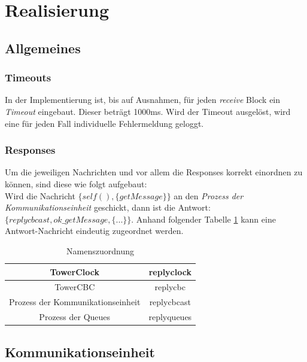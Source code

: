 \section{Realisierung}

\subsection{Allgemeines}

\subsubsection{Timeouts}

In der Implementierung ist, bis auf Ausnahmen, für jeden \textit{receive} Block ein \textit{Timeout} eingebaut. Dieser beträgt 1000ms. Wird der Timeout ausgelöst, wird eine für jeden Fall individuelle Fehlermeldung geloggt.

\subsubsection{Responses}

Um die jeweiligen Nachrichten und vor allem die Responses korrekt einordnen zu können, sind diese wie folgt aufgebaut:\\
Wird die Nachricht $\{self(), \{getMessage\}\}$ an den \textit{Prozess der Kommunikationseinheit} geschickt, dann ist die Antwort: $\{replycbcast, ok\_getMessage, \{...\}\}$. Anhand folgender Tabelle \ref{tab:namenszuordnung} kann eine Antwort-Nachricht eindeutig zugeordnet werden.

\begin{table}[h]
    \centering
    \begin{tabular}{|c|c|}
        \hline
        TowerClock & replyclock \\
        \hline
        TowerCBC & replycbc \\
        \hline
        Prozess der Kommunikationseinheit & replycbcast \\
        \hline
        Prozess der Queues & replyqueues \\
        \hline
    \end{tabular}
    \caption{Namenszuordnung}
    \label{tab:namenszuordnung}
\end{table}
\subsection{Kommunikationseinheit}

